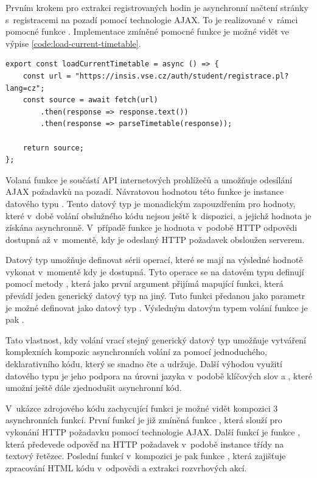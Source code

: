 Prvním krokem pro extrakci registrovaných hodin je asynchronní načtení stránky s~registracemi na pozadí pomocí technologie AJAX. To je realizované v~rámci pomocné funkce . Implementace zmíněné pomocné funkce je možné vidět ve výpise \ref{code:load-current-timetable}.

\begin{lstlisting}[label={code:load-current-timetable}, caption = {Implementace funkce \code{loadCurrentTimetable} (vlastní zpracování)}]
export const loadCurrentTimetable = async () => {
    const url = "https://insis.vse.cz/auth/student/registrace.pl?lang=cz";
    const source = await fetch(url)
        .then(response => response.text())
        .then(response => parseTimetable(response));

    return source;
};
\end{lstlisting}

Volaná funkce  je součástí API internetových prohlížečů a umožňuje odesílání AJAX požadavků na pozadí. Návratovou hodnotou této funkce je instance datového typu . Tento datový typ je monadickým zapouzdřením pro hodnoty, které v~době volání obslužného kódu nejsou ještě k~dispozici, a jejichž hodnota je získána asynchronně. V~případě funkce  je hodnota v~podobě HTTP odpovědi dostupná až v~momentě, kdy je odeslaný HTTP požadavek obsloužen serverem.

Datový typ  umožňuje definovat sérii operací, které se mají na výsledné hodnotě vykonat v~momentě kdy je dostupná. Tyto operace se na datovém typu  definují pomocí metody , která jako první argument přijímá mapující funkci, která převádí jeden generický datový typ na jiný. Tuto funkci předanou jako parametr je možné definovat jako datový typ . Výsledným datovým typem volání funkce  je pak  \cite[kap. 13.2]{flanagan_javascript_2020}.

Tato vlastnost, kdy volání vrací stejný generický datový typ umožňuje vytváření komplexních kompozic asynchronních volání za pomocí jednoduchého, deklarativního kódu, který se snadno čte a udržuje. Další výhodou využití datového typu  je jeho podpora na úrovni jazyka v~podobě klíčových slov  a , které umožní ještě dále zjednodušit asynchronní kód. 

V~ukázce zdrojového kódu zachycující funkci  je možné vidět kompozici 3 asynchronních funkcí. První funkcí je již zmíněná funkce , která slouží pro vykonání HTTP požadavku pomocí technologie AJAX. Další funkcí je funkce , která předevede odpověď na HTTP požadavek v~podobě instance třídy  na textový řetězec. Poslední funkcí v~kompozici je pak funkce , která zajišťuje zpracování HTML kódu v~odpovědi a extrakci rozvrhových akcí.


